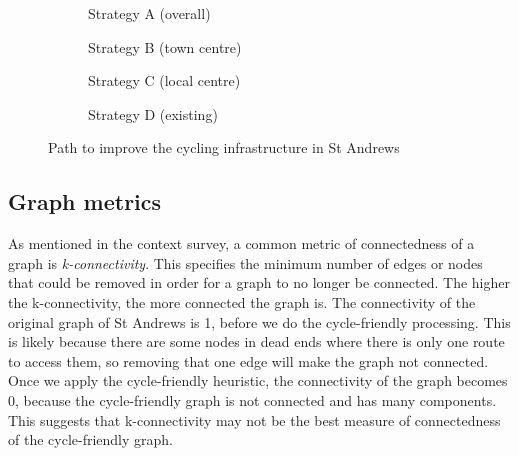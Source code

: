 \documentclass[12pt,a4paper]{report}
\begin{document}
\begin{figure}[ht]
    \centering
    \begin{subfigure}[ht]{0.47\textwidth}
        \centering
        
        \caption{Strategy A (overall)}
        \label{fig:overall st andrews}
    \end{subfigure}
    \hfill
    \begin{subfigure}[ht]{0.47\textwidth}
        \centering
        
        \caption{Strategy B (town centre)}
        \label{fig:centre st andrews}
    \end{subfigure}
    \hfill
    \begin{subfigure}[ht]{0.47\textwidth}
        \centering
        
        \caption{Strategy C (local centre)}
        \label{fig:local st andrews}
    \end{subfigure}
    \hfill
    \begin{subfigure}[ht]{0.47\textwidth}
        \centering
        
        \caption{Strategy D (existing)}
        \label{fig:existing st andrews}
    \end{subfigure}
       \caption{Path to improve the cycling infrastructure in St Andrews}
       \label{fig:path st andrews}
\end{figure}

\subsection{Graph metrics}
As mentioned in the context survey, a common metric of connectedness of a graph is \textit{k-connectivity}. This specifies the minimum number of edges or nodes that could be removed in order for a graph to no longer be connected. The higher the k-connectivity, the more connected the graph is. The connectivity of the original graph of St Andrews is 1, before we do the cycle-friendly processing. This is likely because there are some nodes in dead ends where there is only one route to access them, so removing that one edge will make the graph not connected. Once we apply the cycle-friendly heuristic, the connectivity of the graph becomes 0, because the cycle-friendly graph is not connected and has many components. This suggests that k-connectivity may not be the best measure of connectedness of the cycle-friendly graph.
\end{document}

